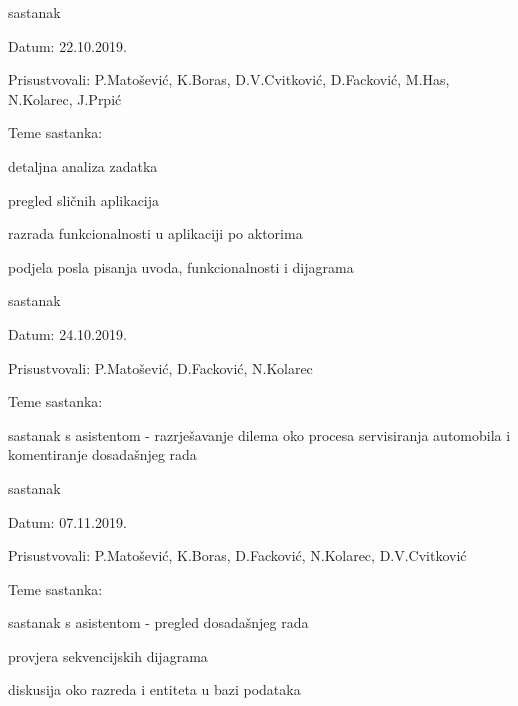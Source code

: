 \begin{packed_enum}
		\item sastanak
		\item[] \begin{packed_item}
			\item Datum: 22.10.2019.
			\item Prisustvovali: P.Matošević, K.Boras, D.V.Cvitković, D.Facković, M.Has, N.Kolarec, J.Prpić
			\item Teme sastanka:
			\begin{packed_item}
				\item  detaljna analiza zadatka
				\item  pregled sličnih aplikacija
				\item  razrada funkcionalnosti u aplikaciji po aktorima
				\item  podjela posla pisanja uvoda, funkcionalnosti i dijagrama
			\end{packed_item}
		\end{packed_item}
	
		\item sastanak
		\item[] \begin{packed_item}
			\item Datum: 24.10.2019.
			\item Prisustvovali: P.Matošević, D.Facković, N.Kolarec
			\item Teme sastanka:
			\begin{packed_item}
				\item  sastanak s asistentom - razrješavanje dilema oko procesa servisiranja automobila i komentiranje dosadašnjeg rada
			\end{packed_item}
		\end{packed_item}


		\item  sastanak
		\item[] \begin{packed_item}
			\item Datum: 07.11.2019.
			\item Prisustvovali: P.Matošević, K.Boras, D.Facković, N.Kolarec, D.V.Cvitković
			\item Teme sastanka:
			\begin{packed_item}
				\item  sastanak s asistentom - pregled dosadašnjeg rada
				\item  provjera sekvencijskih dijagrama
				\item  diskusija oko razreda i entiteta u bazi podataka
			\end{packed_item}
		\end{packed_item}
	

\end{packed_enum}
